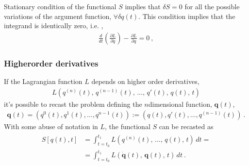 \documentclass[letterpaper,10pt,english]{jupyterBook}
\begin{document}
\sphinxAtStartPar
{} Stationary condition of the functional \(S\) implies that \(\delta S = 0\) for all the possible variations of the argument function, \(\forall \delta q(t)\). This condition implies that the integrand is identically zero, i.e. ,
\begin{equation*}
\begin{split}\frac{d}{dt}\left( \frac{\partial L}{\partial \dot{q}} \right) - \frac{\partial L}{\partial q} = 0 \ ,\end{split}
\end{equation*}

\subsubsection*{Higher\sphinxhyphen{}order derivatives}

\sphinxAtStartPar
{} If the Lagrangian function \(L\) depends on higher order derivatives,
\begin{equation*}
\begin{split}L \left(q^{(n)}(t), \, q^{(n-1)}(t), \, \dots, \, q'(t), \, q(t), \, t \right)\end{split}
\end{equation*}
\sphinxAtStartPar
it’s possible to recast the problem defining the \(n\)\sphinxhyphen{}dimensional function, \(\mathbf{q}(t)\),
\begin{equation*}
\begin{split}\mathbf{q}(t) = \left( q^0(t), q^1(t), \dots, q^{n-1}(t) \right) := \left(q(t), q'(t), \dots, q^{(n-1)}(t) \right) \ .\end{split}
\end{equation*}
\sphinxAtStartPar
With some abuse of notation in \(L\), the functional \(S\) can be recasted as
\begin{equation*}
\begin{split}\begin{aligned}
  S[q(t),t] 
  & = \int_{t=t_0}^{t_1} L(q^{(n)}(t), \, \dots, \, q(t), \, t) \, dt = \\
  & = \int_{t=t_0}^{t_1} L(\dot{\mathbf{q}}(t), \, \mathbf{q}(t), \, t) \, dt \ .
\end{aligned}\end{split}
\end{equation*}
\sphinxAtStartPar
{} 
\end{document}

